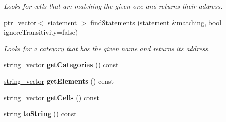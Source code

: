 \begin{DoxyCompactItemize}
\begin{DoxyCompactList}\small\item\em \-Looks for cells that are matching the given one and returns their address. \end{DoxyCompactList}\item 
\hypertarget{classmbdev__ontology_1_1ontology_acc8d92197dc8b96180c1f1e33cff6a67}{\hyperlink{classmbdev_1_1ptr__vector}{ptr\-\_\-vector}$<$ \hyperlink{classmbdev__ontology_1_1statement}{statement} $>$ \hyperlink{classmbdev__ontology_1_1ontology_acc8d92197dc8b96180c1f1e33cff6a67}{find\-Statements} (\hyperlink{classmbdev__ontology_1_1statement}{statement} \&matching, bool ignore\-Transitivity=false)}\label{classmbdev__ontology_1_1ontology_acc8d92197dc8b96180c1f1e33cff6a67}

\begin{DoxyCompactList}\small\item\em \-Looks for a category that has the given name and returns its address. \end{DoxyCompactList}\item 
\hypertarget{classmbdev__ontology_1_1ontology_adefeb11a57e891c9f0195dc3e57e46a0}{\hyperlink{classmbdev_1_1string__vector}{string\-\_\-vector} {\bfseries get\-Categories} () const }\label{classmbdev__ontology_1_1ontology_adefeb11a57e891c9f0195dc3e57e46a0}

\item 
\hypertarget{classmbdev__ontology_1_1ontology_a978a41f8f81f6fd330ae678b22d66ef4}{\hyperlink{classmbdev_1_1string__vector}{string\-\_\-vector} {\bfseries get\-Elements} () const }\label{classmbdev__ontology_1_1ontology_a978a41f8f81f6fd330ae678b22d66ef4}

\item 
\hypertarget{classmbdev__ontology_1_1ontology_a68fd8a8730f58589c8e39e6611d247e7}{\hyperlink{classmbdev_1_1string__vector}{string\-\_\-vector} {\bfseries get\-Cells} () const }\label{classmbdev__ontology_1_1ontology_a68fd8a8730f58589c8e39e6611d247e7}

\item 
\hypertarget{classmbdev__ontology_1_1ontology_ac7ac79e55a7b0914cad5f14156ab2cda}{\hyperlink{classmbdev_1_1string}{string} {\bfseries to\-String} () const }\label{classmbdev__ontology_1_1ontology_ac7ac79e55a7b0914cad5f14156ab2cda}

\end{DoxyCompactItemize}
